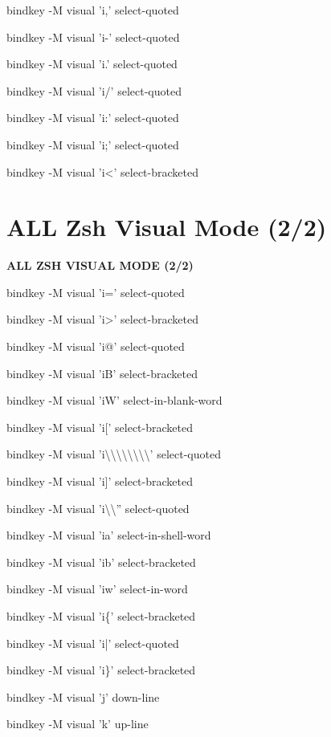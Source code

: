 \documentclass[11pt,a4paper,twoside]{book}
\begin{document}
bindkey -M visual 'i,' select-quoted

bindkey -M visual 'i-' select-quoted

bindkey -M visual 'i.' select-quoted

bindkey -M visual 'i/' select-quoted

bindkey -M visual 'i:' select-quoted

bindkey -M visual 'i;' select-quoted

bindkey -M visual 'i<' select-bracketed


\vspace{16pt}

\section{ALL Zsh Visual Mode (2/2)}


\vspace{10pt}
{\large\bfseries\color{neoncyan} ALL ZSH VISUAL MODE (2/2)}\vspace{6pt}

bindkey -M visual 'i=' select-quoted

bindkey -M visual 'i>' select-bracketed

bindkey -M visual 'i@' select-quoted

bindkey -M visual 'iB' select-bracketed

bindkey -M visual 'iW' select-in-blank-word

bindkey -M visual 'i[' select-bracketed

bindkey -M visual 'i\textbackslash{}\textbackslash{}\textbackslash{}\textbackslash{}\textbackslash{}\textbackslash{}\textbackslash{}\textbackslash{}' select-quoted

bindkey -M visual 'i]' select-bracketed

bindkey -M visual 'i\textbackslash{}\textbackslash{}'' select-quoted

bindkey -M visual 'ia' select-in-shell-word

bindkey -M visual 'ib' select-bracketed

bindkey -M visual 'iw' select-in-word

bindkey -M visual 'i\{' select-bracketed

bindkey -M visual 'i|' select-quoted

bindkey -M visual 'i\}' select-bracketed

bindkey -M visual 'j' down-line

bindkey -M visual 'k' up-line
\end{document}
